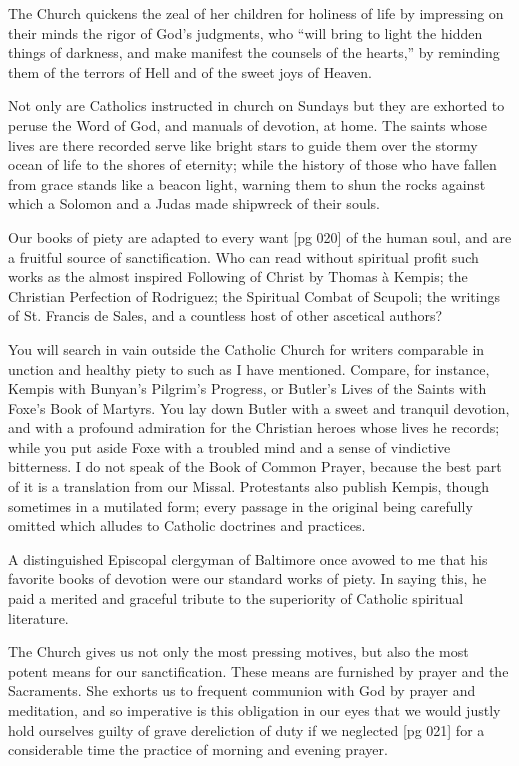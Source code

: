 The Church quickens the zeal of her children for
holiness of life by impressing on their minds the
rigor of God's judgments, who “will bring to light
the hidden things of darkness, and make manifest
the counsels of the hearts,” by reminding them of
the terrors of Hell and of the sweet joys of
Heaven.

Not only are Catholics instructed in church on
Sundays but they are exhorted to peruse the Word
of God, and manuals of devotion, at home. The
saints whose lives are there recorded serve like
bright stars to guide them over the stormy ocean
of life to the shores of eternity; while the history
of those who have fallen from grace stands like a
beacon light, warning them to shun the rocks
against which a Solomon and a Judas made shipwreck
of their souls.

Our books of piety are adapted to every want
[pg 020]
of the human soul, and are a fruitful source of
sanctification. Who can read without spiritual
profit such works as the almost inspired Following
of Christ by Thomas à Kempis; the Christian Perfection
of Rodriguez; the Spiritual Combat of
Scupoli; the writings of St. Francis de Sales, and
a countless host of other ascetical authors?

You will search in vain outside the Catholic
Church for writers comparable in unction and
healthy piety to such as I have mentioned. Compare,
for instance, Kempis with Bunyan's Pilgrim's
Progress, or Butler's Lives of the Saints
with Foxe's Book of Martyrs. You lay down
Butler with a sweet and tranquil devotion, and with a
profound admiration for the Christian heroes
whose lives he records; while you put aside Foxe
with a troubled mind and a sense of vindictive bitterness.
I do not speak of the Book of Common
Prayer, because the best part of it is a translation
from our Missal. Protestants also publish Kempis,
though sometimes in a mutilated form; every
passage in the original being carefully omitted
which alludes to Catholic doctrines and practices.

A distinguished Episcopal clergyman of Baltimore
once avowed to me that his favorite books of
devotion were our standard works of piety. In
saying this, he paid a merited and graceful tribute
to the superiority of Catholic spiritual literature.

The Church gives us not only the most pressing
motives, but also the most potent means for our
sanctification. These means are furnished by
prayer and the Sacraments. She exhorts us to
frequent communion with God by prayer and
meditation, and so imperative is this obligation in
our eyes that we would justly hold ourselves
guilty of grave dereliction of duty if we neglected
[pg 021]
for a considerable time the practice of morning
and evening prayer.


